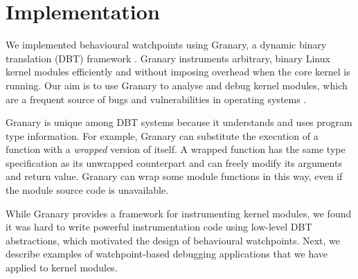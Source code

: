 \documentclass[letterpaper,twocolumn,10pt]{article}
\begin{document}
\section{Implementation}
We implemented behavioural watchpoints using Granary, a dynamic binary translation (DBT) framework \cite{DynamoRIOKernel,GranaryAtOSDI}.  Granary instruments arbitrary, binary Linux kernel modules efficiently and without imposing overhead when the core kernel is running. Our aim is to use Granary to analyse and debug kernel modules, which are a frequent source of bugs and vulnerabilities in operating systems \cite{BGI,LXFI}.

Granary is unique among DBT systems because it understands and uses program type information. For example, Granary can substitute the execution of a function with a \emph{wrapped} version of itself. A wrapped function has the same type specification as its unwrapped counterpart and can freely modify its arguments and return value. Granary can wrap some module functions in this way, even if the module source code is unavailable.

While Granary provides a framework for instrumenting kernel modules, we found it was hard to write powerful instrumentation code using low-level DBT abstractions, which motivated the design of behavioural watchpoints. Next, we describe examples of watchpoint-based debugging applications that we have applied to kernel modules.




\end{document}
